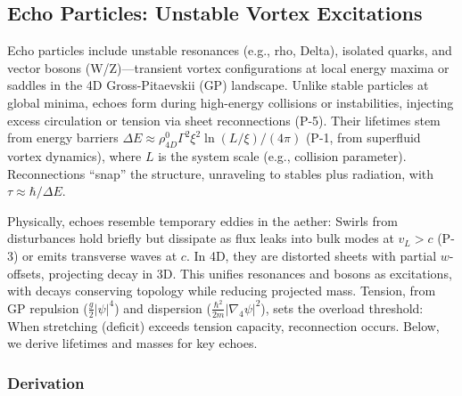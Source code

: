 \subsection{Echo Particles: Unstable Vortex Excitations}

Echo particles include unstable resonances (e.g., rho, Delta), isolated quarks, and vector bosons (W/Z)---transient vortex configurations at local energy maxima or saddles in the 4D Gross-Pitaevskii (GP) landscape. Unlike stable particles at global minima, echoes form during high-energy collisions or instabilities, injecting excess circulation or tension via sheet reconnections (P-5). Their lifetimes stem from energy barriers $\Delta E \approx \rho_{4D}^0 \Gamma^2 \xi^2 \ln(L / \xi) / (4\pi)$ (P-1, from superfluid vortex dynamics), where $L$ is the system scale (e.g., collision parameter). Reconnections ``snap'' the structure, unraveling to stables plus radiation, with $\tau \approx \hbar / \Delta E$.

Physically, echoes resemble temporary eddies in the aether: Swirls from disturbances hold briefly but dissipate as flux leaks into bulk modes at $v_L > c$ (P-3) or emits transverse waves at $c$. In 4D, they are distorted sheets with partial $w$-offsets, projecting decay in 3D. This unifies resonances and bosons as excitations, with decays conserving topology while reducing projected mass. Tension, from GP repulsion ($\frac{g}{2} |\psi|^4$) and dispersion ($\frac{\hbar^2}{2m} |\nabla_4 \psi|^2$), sets the overload threshold: When stretching (deficit) exceeds tension capacity, reconnection occurs. Below, we derive lifetimes and masses for key echoes.

\subsubsection{Derivation}

